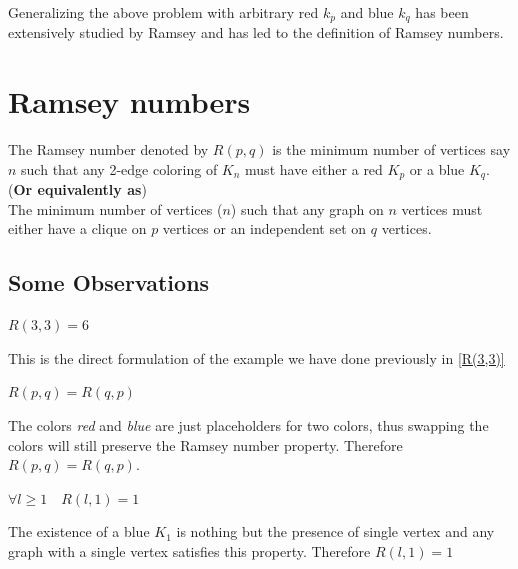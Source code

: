 Generalizing the above problem with arbitrary red $k_p$ and blue $k_q$ has been extensively studied by Ramsey and has led to the definition of Ramsey numbers.
\section{Ramsey numbers}
\begin{definition}
The Ramsey number denoted by $R(p,q)$ is the minimum number of vertices say $n$ such that any 2-edge coloring of $K_n$ must have either a red $K_p$ or a blue $K_q$.\\
(\textbf{Or equivalently as})\\
The minimum number of vertices ($n$) such that any graph on $n$ vertices must either have a clique on $p$ vertices or an independent set on $q$ vertices.
\end{definition}

\subsection{Some Observations}
\begin{property}
$R(3,3)=6$
\end{property}
This is the direct formulation of the example we have done previously in \ref{R(3,3)}
\begin{property}
$R(p,q) = R(q,p)$
\end{property}
The colors \textit{red} and \textit{blue} are just placeholders for two colors, thus swapping the colors will still preserve the Ramsey number property. Therefore $R(p,q) = R(q,p)$.
\begin{property}
$\forall l \geq 1 \quad R(l,1) = 1$
\end{property}
The existence of a blue $K_1$ is nothing but the presence of single vertex and any graph with a single vertex satisfies this property. Therefore $R(l,1) = 1$


